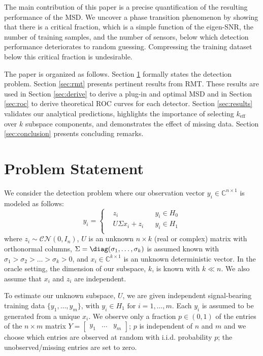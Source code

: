 The main contribution of this paper is a precise quantification of the resulting performance of the MSD. We uncover a phase transition phenomenon by showing that there is a critical fraction, which is a simple function of the eigen-SNR, the number of training samples, and the number of sensors, below which detection performance deteriorates to random guessing. Compressing the training dataset below this critical fraction is undesirable.

The paper is organized as follows. Section \ref{sec:prob stat} formally states the detection problem. Section \ref{sec:rmt} presents pertinent results from RMT. These results are used in Section \ref{sec:derive} to derive a plug-in and optimal MSD and in Section \ref{sec:roc} to derive theoretical ROC curves for each detector. Section \ref{sec:results} validates our analytical predictions, highlights the importance of selecting $k_\text{eff}$ over $k$ subspace components, and demonstrates the effect of missing data. Section \ref{sec:conclusion} presents concluding remarks.

\section{Problem Statement}\label{sec:prob stat}

We consider the detection problem where our observation vector $y_i \in \mathbb{C}^{n \times 1}$ is modeled as follows:
\begin{equation}\label{eq:problem}
y_i=\left\{
\begin{aligned}
&z_i
&& y_i\in H_0\\
&U\Sigma x_i+z_i
&& y_i\in H_1\\
\end{aligned}\right.
\end{equation}
where $z_i\sim\mathcal{CN}(0,I_n)$, $U$ is an unknown $n\times k$ (real or complex) matrix with orthonormal columns, $\Sigma=\diag(\sigma_1,\dots,\sigma_k)$ is assumed known with $\sigma_1>\sigma_2>\dots>\sigma_k>0$, and $x_i\in\mathbb{C}^{k\times 1}$ is an unknown deterministic vector. In the oracle setting, the dimension of our subspace, $k$, is known with $k\ll n$. We also assume that $x_i$ and $z_i$ are independent.

To estimate our unknown subspace, $U$, we are given independent signal-bearing training data $\{y_1,\dots,y_m\}$, with $y_i\in H_1 \text{ for } i=1,\dots,m$. Each $y_i$ is assumed to be generated from a unique $x_i$. We observe only a fraction $p \in (0,1)$ of the entries of the $n \times m$ matrix $Y = \begin{bmatrix} y_1 & \ldots & y_{m} \end{bmatrix}$; $p$ is independent of $n$ and $m$ and we choose which entries are observed at random with i.i.d. probability $p$; the unobserved/missing entries are set to zero.

